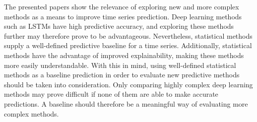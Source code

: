 The presented papers show the relevance of exploring new and more complex methods as a means to improve time series prediction.
Deep learning methods such as LSTMs have high predictive accuracy,
and exploring these methods further may therefore prove to be advantageous.
Nevertheless, statistical methods supply a well-defined predictive baseline for a time series.
Additionally, statistical methods have the advantage of improved explainability,
making these methods more easily understandable.
With this in mind, using well-defined statistical methods as a baseline prediction in order to evaluate new predictive methods should be taken into consideration.
Only comparing highly complex deep learning methods may prove difficult if none of them are able to make accurate predictions.
A baseline should therefore be a meaningful way of evaluating more complex methods.


\iffalse
  The paper \cite{Bandara2017} points out that in non-stationary time series, the distant past is typically less
  useful for forecast, as underlying patterns and relationships will have changed in the meantime.

  In \autoref{section:RelatedWork:forecasting-ecommerce}
  we highlighted ANNs ability to outperform statistical methods when macro-economic
  conditions were unstable.
  In \autoref{section:RelatedWork:Model-structure} we mentioned how statistical models
  potentially missed the bigger picture in a domain of many related time series.
  These findings makes it clear to us that limiting our solution to a statistical method
  will be a mistake, and exploring a more complicated ANN model seems beneficial.
  However, a need for a baseline model in order to compare the results of the ANN model,
  a statistical method, like SARIMA could be useful.
\fi
